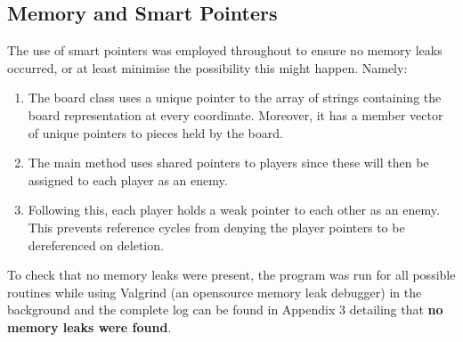 \documentclass[11pt]{article} %
\begin{document}
\subsection{Memory and Smart Pointers}
The use of smart pointers was employed throughout to ensure no memory leaks occurred, or at least minimise the possibility
this might happen.
Namely:
\begin{enumerate}[label=\roman*.]
  \item The board class uses a unique pointer to the array of strings containing the board representation at every
  coordinate. Moreover, it has a member vector of unique pointers to pieces held by the board.
  \item The main method uses shared pointers to players since these will then be assigned to each player as an enemy.
  \item Following this, each player holds a weak pointer to each other as an enemy.
   This prevents reference cycles from denying the player pointers to be dereferenced on deletion.
\end{enumerate}
To check that no memory leaks were present, the program was run for all possible
routines while using Valgrind (an opensource memory leak debugger) in the background
and the complete log can be found in Appendix 3 detailing that
\textbf{no memory leaks were found}.
\end{document}
